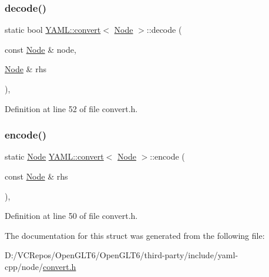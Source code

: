 \subsubsection{\texorpdfstring{decode()}{decode()}}
{\footnotesize\ttfamily static bool \mbox{\hyperlink{struct_y_a_m_l_1_1convert}{Y\+A\+M\+L\+::convert}}$<$ \mbox{\hyperlink{class_y_a_m_l_1_1_node}{Node}} $>$\+::decode (\begin{DoxyParamCaption}\item[{const \mbox{\hyperlink{class_y_a_m_l_1_1_node}{Node}} \&}]{node,  }\item[{\mbox{\hyperlink{class_y_a_m_l_1_1_node}{Node}} \&}]{rhs }\end{DoxyParamCaption})\hspace{0.3cm}{\ttfamily [inline]}, {\ttfamily [static]}}



Definition at line 52 of file convert.\+h.

\mbox{\label{struct_y_a_m_l_1_1convert_3_01_node_01_4_aac5a08ab38dd161e1b24f4643f7816b8}} 
\subsubsection{\texorpdfstring{encode()}{encode()}}
{\footnotesize\ttfamily static \mbox{\hyperlink{class_y_a_m_l_1_1_node}{Node}} \mbox{\hyperlink{struct_y_a_m_l_1_1convert}{Y\+A\+M\+L\+::convert}}$<$ \mbox{\hyperlink{class_y_a_m_l_1_1_node}{Node}} $>$\+::encode (\begin{DoxyParamCaption}\item[{const \mbox{\hyperlink{class_y_a_m_l_1_1_node}{Node}} \&}]{rhs }\end{DoxyParamCaption})\hspace{0.3cm}{\ttfamily [inline]}, {\ttfamily [static]}}



Definition at line 50 of file convert.\+h.



The documentation for this struct was generated from the following file\+:\begin{DoxyCompactItemize}
\item 
D\+:/\+V\+C\+Repos/\+Open\+G\+L\+T6/\+Open\+G\+L\+T6/third-\/party/include/yaml-\/cpp/node/\mbox{\hyperlink{convert_8h}{convert.\+h}}\end{DoxyCompactItemize}
